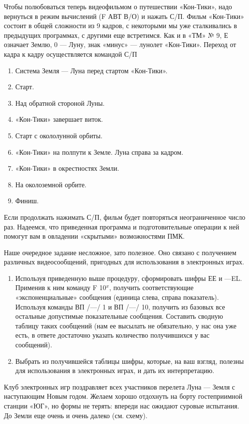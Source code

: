 \documentclass[11pt,a4paper,oneside]{article}
\begin{document}
Чтобы полюбоваться теперь видеофильмом о путешествии «Кон-Тики», надо вернуться в режим вычислений (F АВТ В/О) и нажать С/П. Фильм «Кон-Тики» состоит в общей сложности из 9 кадров, с некоторыми мы уже сталкивались в предыдущих программах, с другими еще встретимся. Как и в «ТМ» № 9, Е означает Землю, 0 — Луну, знак «минус» — лунолет «Кон-Тики». Переход от кадра к кадру осуществляется командой С/П

\begin{enumerate}
\item Система Земля — Луна перед стартом «Кон-Тики».
\item Старт.
\item Над обратной стороной Луны.
\item «Кон-Тики» завершает виток.
\item Старт с окололунной орбиты.
\item «Кон-Тики» на полпути к Земле. Луна справа за кадром.
\item «Кон-Тики» в окрестностях Земли.
\item На околоземной орбите.
\item Финиш.
\end{enumerate}

Если продолжать нажимать С/П, фильм будет повторяться неограниченное число раз. Надеемся, что приведенная программа и подготовительные операции к ней помогут вам в овладении «скрытыми» возможностями ПМК.

Наше очередное задание несложное, зато полезное. Оно связано с получением различных видеосообщений, пригодных для использования в электронных играх.

\begin{enumerate}
\item Используя приведенную выше процедуру, сформировать шифры ЕЕ и —EL. Применив к ним команду F 10$^{x}$, получить соответствующие «экспоненциальные» сообщения (единица слева, справа показатель). Используя команды ВП /—/ 1 и ВП /—/ 10, получить из базовых все остальные допустимые показательные сообщения. Составить сводную таблицу таких сообщений (нам ее высылать не обязательно, у нас она уже есть, в ответе достаточно указать количество получившихся у вас сообщений).
\item Выбрать из получившейся таблицы шифры, которые, на ваш взгляд, полезны для использования в электронных играх, и дать их интерпретацию.
\end{enumerate}

Клуб электронных игр поздравляет всех участников перелета Луна — Земля с наступающим Новым годом. Желаем хорошо отдохнуть на борту гостеприимной станции «ЮГ», но формы не терять: впереди нас ожидают суровые  испытания. До Земли еще очень и очень далеко (см. схему).
\end{document}
